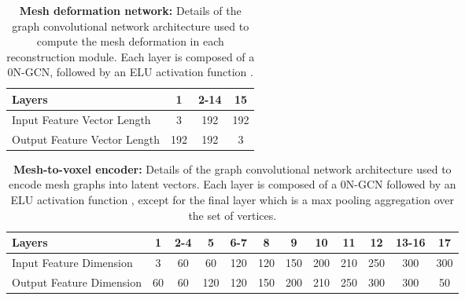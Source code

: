 \documentclass{article}
\begin{document}
\begin{table*}[ht]
\centering
\begin{tabular}{|l|c|c|c|}
\hline
Layers                       & 1   & 2-14 & 15  \\ \hline
Input Feature Vector Length  & 3   & 192  & 192 \\ \hline
Output Feature Vector Length & 192 & 192  & 3   \\ \hline
\end{tabular}
\caption{\textbf{Mesh deformation network:} Details of the graph convolutional network architecture used to compute the mesh deformation in each reconstruction module. Each layer is composed of a 0N-GCN, followed by an ELU activation function \cite{clevert2015fast}.}
\label{table:MeshDeform}
\end{table*}

\begin{table*}[ht]
\centering
\begin{tabular}{|l|c|c|c|c|c|c|c|c|c|c|c|}
\hline
Layers      & 1      & 2-4    & 5      & 6-7    & 8      & 9      & 10     & 11     & 12     & 13-16  & 17              \\ \hline
Input Feature Dimension  & 3      & 60     & 60     & 120    & 120    & 150    & 200    & 210    & 250    & 300    & 300             \\ \hline
Output Feature Dimension & 60     & 60     & 120    & 120    & 150    & 200    & 210    & 250    & 300    & 300    & 50              \\ \hline

\end{tabular}
\caption{\textbf{Mesh-to-voxel encoder:} Details of the graph convolutional network architecture used to encode mesh graphs into latent vectors. Each layer is composed of a 0N-GCN followed by an ELU activation function \cite{clevert2015fast}, except for the final layer which is a max pooling aggregation over the set of vertices.}
\label{table:MeshEncoder}
\end{table*}
\end{document}
